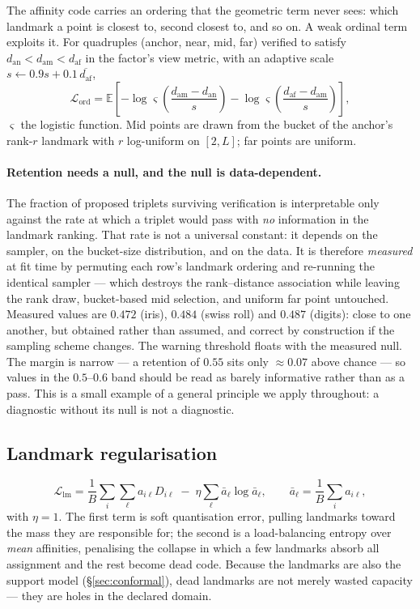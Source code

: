 \documentclass[12pt]{iopart}
\theoremstyle{definition}
\theoremstyle{plain}
\theoremstyle{remark}
\newcommand{\E}{\mathbb{E}}
\newcommand{\loss}{\mathcal{L}}
\begin{document}
The affinity code carries an ordering that the geometric term never sees: which
landmark a point is closest to, second closest to, and so on. A weak ordinal
term exploits it. For quadruples (anchor, near, mid, far) verified to satisfy
$d_{\mathrm{an}}<d_{\mathrm{am}}<d_{\mathrm{af}}$ in the factor's view metric,
with an adaptive scale $s\leftarrow 0.9s+0.1\,\overline{d_{\mathrm{af}}}$,
\begin{equation}
\label{eq:ord}
\loss_{\mathrm{ord}}
=
\E\!\left[
-\log\varsigma\!\left(\frac{d_{\mathrm{am}}-d_{\mathrm{an}}}{s}\right)
-\log\varsigma\!\left(\frac{d_{\mathrm{af}}-d_{\mathrm{am}}}{s}\right)
\right],
\end{equation}
$\varsigma$ the logistic function. Mid points are drawn from the bucket of the
anchor's rank-$r$ landmark with $r$ log-uniform on $[2,L]$; far points are
uniform.

\paragraph{Retention needs a null, and the null is data-dependent.}
The fraction of proposed triplets surviving verification is interpretable only
against the rate at which a triplet would pass with \emph{no} information in
the landmark ranking. That rate is not a universal constant: it depends on the
sampler, on the bucket-size distribution, and on the data. It is therefore
\emph{measured} at fit time by permuting each row's landmark ordering and
re-running the identical sampler --- which destroys the rank--distance
association while leaving the rank draw, bucket-based mid selection, and
uniform far point untouched. Measured values are $0.472$ (iris), $0.484$ (swiss
roll) and $0.487$ (digits): close to one another, but obtained rather than
assumed, and correct by construction if the sampling scheme changes. The
warning threshold floats with the measured null. The margin is narrow --- a
retention of $0.55$ sits only $\approx 0.07$ above chance --- so values in the
$0.5$--$0.6$ band should be read as barely informative rather than as a pass.
This is a small example of a general principle we apply throughout: a
diagnostic without its null is not a diagnostic.

\subsection{Landmark regularisation}
\label{sec:lm}

\begin{equation}
\label{eq:lm}
\loss_{\mathrm{lm}}
=
\frac{1}{B}\sum_i\sum_\ell a_{i\ell}D_{i\ell}
\;-\;
\eta\sum_\ell \bar a_\ell\log\bar a_\ell,
\qquad
\bar a_\ell=\frac{1}{B}\sum_i a_{i\ell},
\end{equation}
with $\eta=1$. The first term is soft quantisation error, pulling landmarks
toward the mass they are responsible for; the second is a load-balancing
entropy over \emph{mean} affinities, penalising the collapse in which a few
landmarks absorb all assignment and the rest become dead code. Because the
landmarks are also the support model (\S\ref{sec:conformal}), dead landmarks
are not merely wasted capacity --- they are holes in the declared domain.
\end{document}
